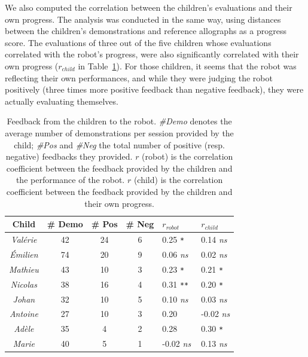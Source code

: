 \documentclass[10pt,a4paper]{article}
\begin{document}
We also computed the correlation between the children's evaluations and their own
progress. The analysis was conducted in the same way, using distances between the children's demonstrations and reference allographs as a progress score.
The evaluations of three out of the five children whose evaluations correlated with the robot's progress, were also significantly correlated with their own progress ($r_{child}$ in Table~\ref{table:scores}). For
those children, it seems that the robot was reflecting their own performances, and while they
were judging the robot positively (three times more positive feedback than negative feedback),
they were actually evaluating themselves.


\begin{table}
    \centering
    \caption{\footnotesize Feedback from the children to the robot. \emph{\#Demo}
        denotes the average number of demonstrations per session provided by the child;
        \emph{\#Pos} and \emph{\#Neg} the total number of positive (resp.
        negative) feedbacks they provided. $r$ (robot) is the correlation coefficient
        between the feedback provided by the children and the performance of the
        robot. $r$ (child) is the correlation coefficient
        between the feedback provided by the children and their own progress.
        }
    \begin{tabular}{ccccll}
        \toprule
        \bf Child      & \bf \# Demo & \bf \# Pos & \bf \# Neg & $r_{robot}$ & $r_{child}$ \\ \midrule
        \emph{Val\'erie} & 42           & 24              & 6               & 0.25 \small\tt ** & 0.14 \small\it ns\\ 
        \emph{\'Emilien} & 74           & 20              & 9               & 0.06 \small\it ns & 0.02 \small\it ns\\
        \emph{Mathieu} & 43           & 10              & 3               & 0.23 \small\tt ** & 0.21 \small\tt **\\
        \emph{Nicolas} & 38           & 16              & 4               & 0.31 \small\tt *** & 0.20 \small\tt **\\
        \emph{Johan}   & 32           & 10              & 5               & 0.10 \small\it ns & 0.03 \small\it ns\\
        \emph{Antoine} & 27           & 10              & 3               & 0.20 \small\tt * & -0.02 \small\it ns \\
        \emph{Ad\`ele}   & 35           & 4               & 2               & 0.28 \small\tt * & 0.30 \small\tt ** \\
        \emph{Marie}   & 40           & 5               & 1               & -0.02 \small\it ns & 0.13 \small\it ns\\ \bottomrule
    \end{tabular}

    \label{table:scores}
\end{table}
\end{document}
